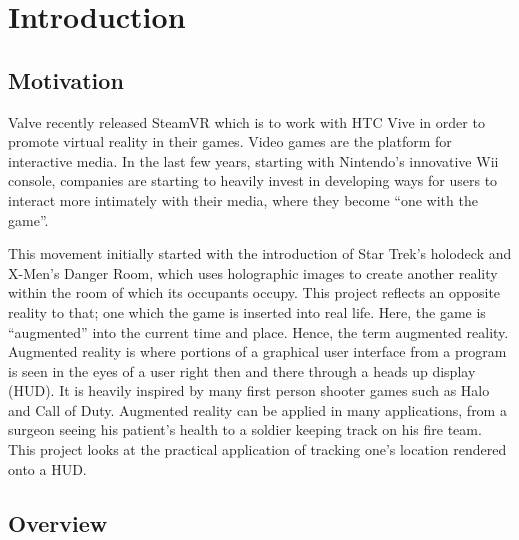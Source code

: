 
\chapter{Introduction} %

\label{Introduction} %


\section{Motivation}

Valve recently released SteamVR which is to work with HTC Vive in order to promote virtual reality in their games. Video games are the platform for interactive media. In the last few years, starting with Nintendo’s innovative Wii console, companies are starting to heavily invest in developing ways for users to interact more intimately with their media, where they become “one with the game”. 

This movement initially started with the introduction of Star Trek’s holodeck and X-Men’s Danger Room, which uses holographic images to create another reality within the room of which its occupants occupy. This project reflects an opposite reality to that; one which the game is inserted into real life. Here, the game is “augmented” into the current time and place. Hence, the term augmented reality. Augmented reality is where portions of a graphical user interface from a program is seen in the eyes of a user right then and there through a heads up display (HUD). It is heavily inspired by many first person shooter games such as Halo and Call of Duty. Augmented reality can be applied in many applications, from a surgeon seeing his patient’s health to a soldier keeping track on his fire team. This project looks at the practical application of tracking one’s location rendered onto a HUD.

\section{Overview}


